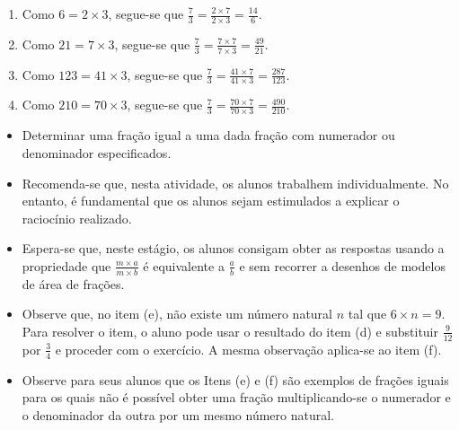 \begin{multicols}{2}
\begin{orientacoes}{}{}

\end{orientacoes}

\begin{solucao}{}{}
\begin{enumerate} [\quad a)] %
    \item       Como       $6 = 2 \times 3$, segue-se que       $\frac{7}{3} =
\frac{2 \times 7}{2 \times 3} = \frac{14}{6}$.
    \item       Como       $21 = 7 \times 3$, segue-se que       $\frac{7}{3} =
\frac{7 \times 7}{7 \times 3} = \frac{49}{21}$.
    \item       Como       $123 = 41 \times 3$, segue-se que       $\frac{7}{3}
= \frac{41 \times 7}{41 \times 3} = \frac{287}{123}$.
    \item       Como       $210 = 70 \times 3$, segue-se que       $\frac{7}{3}
= \frac{70 \times 7}{70 \times 3} = \frac{490}{210}$.
\end{enumerate} %
\end{solucao}


\begin{objetivos}[label=chap4-ativ10]{}{}
\begin{itemize} %
    \item       Determinar uma fração igual a uma dada fração com numerador ou
denominador especificados.
\end{itemize} %
\end{objetivos}


\begin{orientacoes}
\begin{itemize} %
    \item       Recomenda-se que, nesta atividade, os alunos trabalhem
individualmente. No entanto, é fundamental que os alunos sejam estimulados a
explicar o raciocínio realizado.
    \item       Espera-se que, neste estágio, os alunos consigam obter as
respostas usando a propriedade que       $\frac{m \times a}{m \times b}$       é
equivalente a       $\frac{a}{b}$       e sem recorrer a desenhos de modelos de
área de frações.
    \item       Observe que, no item (e), não existe um número natural       $n$
      tal que       $6 \times n = 9$. Para resolver o item, o aluno pode usar o
resultado do item (d) e substituir       $\frac{9}{12}$       por
$\frac{3}{4}$       e proceder com o exercício. A mesma observação aplica-se ao
item (f).
    \item       Observe para seus alunos que os Itens (e) e (f) são exemplos de
frações iguais para os quais não é possível obter uma fração multiplicando-se o
numerador e o denominador da outra por um mesmo número natural.
\end{itemize} %



\end{orientacoes}
\end{multicols}
